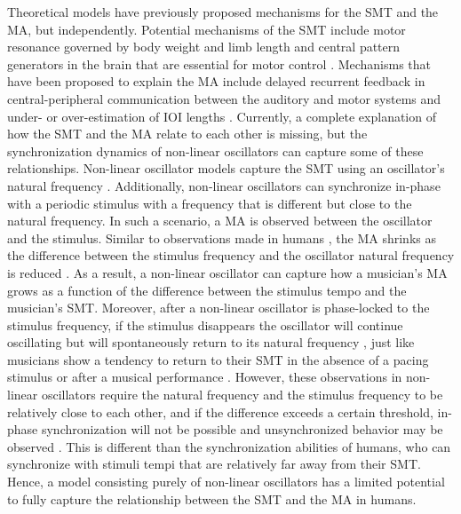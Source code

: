 \documentclass{report}
\begin{document}
Theoretical models have previously proposed mechanisms for the SMT and the MA, but independently. Potential mechanisms of the SMT include motor resonance governed by body weight and limb length \cite{goodman2000advantages} and central pattern generators in the brain that are essential for motor control \cite{latash1992virtual, wolpert2007probabilistic}. Mechanisms that have been proposed to explain the MA include delayed recurrent feedback in central-peripheral communication between the auditory and motor systems \cite{stepp2010strong, roman2019delayed, aschersleben2002temporal} and under- or over-estimation of IOI lengths \cite{loehr2009subdividing}. Currently, a complete explanation of how the SMT and the MA relate to each other is missing, but the synchronization dynamics of non-linear oscillators can capture some of these relationships. Non-linear oscillator models capture the SMT using an oscillator's natural frequency \cite{large2002tracking, large2002perceiving, mcauley2006time}. Additionally, non-linear oscillators can synchronize in-phase with a periodic stimulus with a frequency that is different but close to the natural frequency. In such a scenario, a MA is observed between the oscillator and the stimulus. Similar to observations made in humans \cite{scheurich2018tapping}, the MA shrinks as the difference between the stimulus frequency and the oscillator natural frequency is reduced \cite{kim2015signal, kim2019mode}. As a result, a non-linear oscillator can capture how a musician's MA grows as a function of the difference between the stimulus tempo and the musician's SMT. Moreover, after a non-linear oscillator is phase-locked to the stimulus frequency, if the stimulus disappears the oscillator will continue oscillating but will spontaneously return to its natural frequency \cite{kim2015signal, kim2019mode}, just like musicians show a tendency to return to their SMT in the absence of a pacing stimulus \cite{zamm2018musicians} or after a musical performance \cite{zamm2016endogenous}. However, these observations in non-linear oscillators require the natural frequency and the stimulus frequency to be relatively close to each other, and if the difference exceeds a certain threshold, in-phase synchronization will not be possible and unsynchronized behavior may be observed \cite{kim2015signal, kim2019mode}. This is different than the synchronization abilities of humans, who can synchronize with stimuli tempi that are relatively far away from their SMT. Hence, a model consisting purely of non-linear oscillators has a limited potential to fully capture the relationship between the SMT and the MA in humans.
\end{document}
